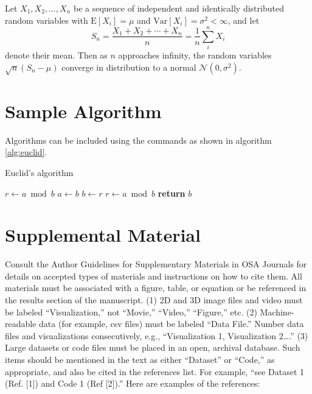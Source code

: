 \documentclass[9pt,twocolumn,twoside]{osajnl}
\begin{document}
Let $X_1, X_2, \ldots, X_n$ be a sequence of independent and identically distributed random variables with $\text{E}[X_i] = \mu$ and $\text{Var}[X_i] = \sigma^2 < \infty$, and let
\begin{equation}
S_n = \frac{X_1 + X_2 + \cdots + X_n}{n}
      = \frac{1}{n}\sum_{i}^{n} X_i
\label{eq:refname1}
\end{equation}
denote their mean. Then as $n$ approaches infinity, the random variables $\sqrt{n}(S_n - \mu)$ converge in distribution to a normal $\mathcal{N}(0, \sigma^2)$.

\section{Sample Algorithm}

Algorithms can be included using the commands as shown in algorithm \ref{alg:euclid}.

\begin{algorithm}
\caption{Euclid’s algorithm}\label{alg:euclid}
\begin{algorithmic}[1]
\State $r\gets a\bmod b$
\State $a\gets b$
\State $b\gets r$
\State $r\gets a\bmod b$
\EndWhile\label{euclidendwhile}
\State \textbf{return} $b$
\EndProcedure
\end{algorithmic}
\end{algorithm}

\section{Supplemental Material}

Consult the Author Guidelines for Supplementary Materials in OSA Journals for details on accepted types of materials and instructions on how to cite them.
All materials must be associated with a figure, table, or equation or be referenced in the results section of the manuscript. 
(1) 2D and 3D image files and video must be labeled “Visualization,” not “Movie,” “Video,” “Figure,” etc. 
(2) Machine-readable data (for example, csv files) must be labeled  “Data File.”  Number data files and visualizations consecutively, e.g., “Visualization 1, Visualization 2….”
(3) Large datasets or code files must be placed in an open, archival database.  Such items should be mentioned in the text as either “Dataset” or “Code,” as appropriate, and also be cited in the references list.  For example, “see Dataset 1 (Ref. [1]) and Code 1 (Ref [2]).” Here are examples of the references: 
\end{document}

